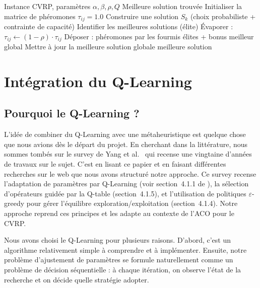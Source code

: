 \documentclass[12pt, a4paper]{article}
\begin{document}
\begin{algorithm}[H]
\caption{ACO classique pour le CVRP}
\begin{algorithmic}[1]
\REQUIRE Instance CVRP, paramètres $\alpha, \beta, \rho, Q$
\ENSURE Meilleure solution trouvée
\STATE Initialiser la matrice de phéromones $\tau_{ij} = 1.0$
        \STATE Construire une solution $S_k$ (choix probabiliste + contrainte de capacité)
    \ENDFOR
    \STATE Identifier les meilleures solutions (élite)
    \STATE Évaporer : $\tau_{ij} \leftarrow (1-\rho) \cdot \tau_{ij}$
    \STATE Déposer : phéromones par les fourmis élites + bonus meilleur global
    \STATE Mettre à jour la meilleure solution globale
\ENDFOR
\RETURN meilleure solution
\end{algorithmic}
\end{algorithm}

\section{Intégration du Q-Learning}

\subsection{Pourquoi le Q-Learning ?}

L'idée de combiner du Q-Learning avec une métaheuristique est quelque chose que nous avions dès le départ du projet. En cherchant dans la littérature, nous sommes tombés sur le survey de Yang et al.\ \cite{yang2024qlma} qui recense une vingtaine d'années de travaux sur le sujet. C'est en lisant ce papier et en faisant différentes recherches sur le web que nous avons structuré notre approche. Ce survey recense l'adaptation de paramètres par Q-Learning (voir section~4.1.1 de \cite{yang2024qlma}), la sélection d'opérateurs guidée par la Q-table (section~4.1.5), et l'utilisation de politiques $\varepsilon$-greedy pour gérer l'équilibre exploration/exploitation (section~4.1.4). Notre approche reprend ces principes et les adapte au contexte de l'ACO pour le CVRP.

Nous avons choisi le Q-Learning \cite{watkins1992qlearning} pour plusieurs raisons. D'abord, c'est un algorithme relativement simple à comprendre et à implémenter. Ensuite, notre problème d'ajustement de paramètres se formule naturellement comme un problème de décision séquentielle : à chaque itération, on observe l'état de la recherche et on décide quelle stratégie adopter.
\end{document}
